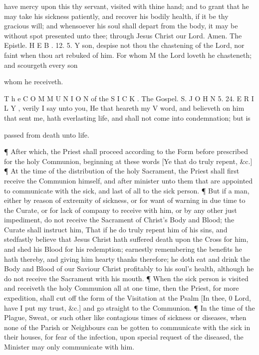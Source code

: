 have mercy upon this thy servant, visited with thine hand; and to grant that he may take his sickness patiently, and recover his bodily health, if it be thy gracious will; and whensoever his soul shall depart from the body, it may be without spot presented unto thee; through Jesus Christ our Lord. Amen. The Epistle. H E B . 12. 5. Y son, despise not thou the chastening of the Lord, nor faint when thou art rebuked of him. For whom M the Lord loveth he chasteneth; and scourgeth every son

whom he receiveth.

T h e C O M M U N I O N of the S I C K . The Gospel. S. J O H N 5. 24. E R I L Y , verily I say unto you, He that heareth my V word, and believeth on him that sent me, hath everlasting life, and shall not come into condemnation; but is

passed from death unto life.

¶ After which, the Priest shall proceed according to the Form before prescribed for the holy Communion, beginning at these words [Ye that do truly repent, \&c.] ¶ At the time of the distribution of the holy Sacrament, the Priest shall first receive the Communion himself, and after minister unto them that are appointed to communicate with the sick, and last of all to the sick person. ¶ But if a man, either by reason of extremity of sickness, or for want of warning in due time to the Curate, or for lack of company to receive with him, or by any other just impediment, do not receive the Sacrament of Christ’s Body and Blood; the Curate shall instruct him, That if he do truly repent him of his sins, and stedfastly believe that Jesus Christ hath suffered death upon the Cross for him, and shed his Blood for his redemption; earnestly remembering the benefits he hath thereby, and giving him hearty thanks therefore; he doth eat and drink the Body and Blood of our Saviour Christ profitably to his soul's health, although he do not receive the Sacrament with his mouth. ¶ When the sick person is visited and receiveth the holy Communion all at one time, then the Priest, for more expedition, shall cut off the form of the Visitation at the Psalm [In thee, 0 Lord, have I put my trust, \&c.] and go straight to the Communion. ¶ In the time of the Plague, Sweat, or such other like contagious times of sickness or diseases, when none of the Parish or Neighbours can be gotten to communicate with the sick in their houses, for fear of the infection, upon special request of the diseased, the Minister may only communicate with him.

